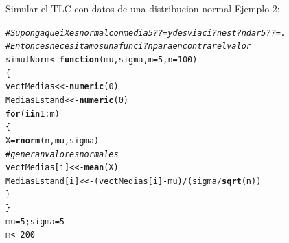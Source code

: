 \documentclass[10pt,a4paper]{article}\usepackage[]{graphicx}\usepackage[]{color}
\makeatletter
\newcommand{\hlnum}[1]{\textcolor[rgb]{0.686,0.059,0.569}{#1}}%
\newcommand{\hlcom}[1]{\textcolor[rgb]{0.678,0.584,0.686}{\textit{#1}}}%
\newcommand{\hlopt}[1]{\textcolor[rgb]{0,0,0}{#1}}%
\newcommand{\hlstd}[1]{\textcolor[rgb]{0.345,0.345,0.345}{#1}}%
\newcommand{\hlkwa}[1]{\textcolor[rgb]{0.161,0.373,0.58}{\textbf{#1}}}%
\newcommand{\hlkwb}[1]{\textcolor[rgb]{0.69,0.353,0.396}{#1}}%
\newcommand{\hlkwc}[1]{\textcolor[rgb]{0.333,0.667,0.333}{#1}}%
\newcommand{\hlkwd}[1]{\textcolor[rgb]{0.737,0.353,0.396}{\textbf{#1}}}%
\newenvironment{kframe}{%
 \def\at@end@of@kframe{}%
 \ifinner\ifhmode%
  \def\at@end@of@kframe{\end{minipage}}%
  \begin{minipage}{\columnwidth}%
 \fi\fi%
 \def\FrameCommand##1{\hskip\@totalleftmargin \hskip-\fboxsep
 \colorbox{shadecolor}{##1}\hskip-\fboxsep
     \hskip-\linewidth \hskip-\@totalleftmargin \hskip\columnwidth}%
 \MakeFramed {\advance\hsize-\width
   \@totalleftmargin\z@ \linewidth\hsize
   \@setminipage}}%
 {\par\unskip\endMakeFramed%
 \at@end@of@kframe}
\newenvironment{knitrout}{}{} %
\makeatother
\begin{document}
Simular el TLC con datos de una distribucion normal
Ejemplo 2: 
\begin{knitrout}
\color{fgcolor}\begin{kframe}
\begin{alltt}
\hlcom{#Suponga que  i Xes normal con media  5 ??= y desviaci?n est?ndar  5 ??= . }
\hlcom{#Entonces necesitamos una funci?n para encontrar el valor }
\hlstd{simulNorm} \hlkwb{<-} \hlkwa{function}\hlstd{(}\hlkwc{mu}\hlstd{,}\hlkwc{sigma}\hlstd{,} \hlkwc{m}\hlstd{=}\hlnum{5}\hlstd{,} \hlkwc{n}\hlstd{=}\hlnum{100}\hlstd{)}
\hlstd{\{}
  \hlstd{vectMedias} \hlkwb{<<-} \hlkwd{numeric}\hlstd{(}\hlnum{0}\hlstd{)}
  \hlstd{MediasEstand} \hlkwb{<<-} \hlkwd{numeric}\hlstd{(}\hlnum{0}\hlstd{)}
  \hlkwa{for} \hlstd{(i} \hlkwa{in} \hlnum{1}\hlopt{:}\hlstd{m)}
  \hlstd{\{}
    \hlstd{X} \hlkwb{=} \hlkwd{rnorm}\hlstd{(n, mu, sigma)}
    \hlcom{# genera n valores normales }
    \hlstd{vectMedias[i]} \hlkwb{<<-} \hlkwd{mean}\hlstd{(X)}
    \hlstd{MediasEstand[i]} \hlkwb{<<-} \hlstd{(vectMedias[i]} \hlopt{-} \hlstd{mu)}\hlopt{/}\hlstd{(sigma}\hlopt{/}\hlkwd{sqrt}\hlstd{(n))}
  \hlstd{\}}
\hlstd{\}}
\hlstd{mu}\hlkwb{=}\hlnum{5}\hlstd{; sigma}\hlkwb{=}\hlnum{5}
\hlstd{m} \hlkwb{<-} \hlnum{200}


\end{alltt}
\end{kframe}
\end{knitrout}
\end{document}
